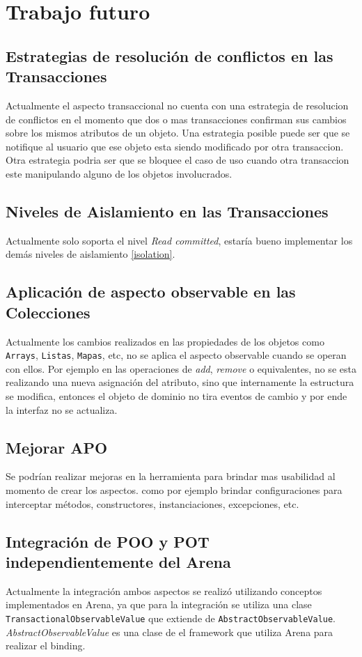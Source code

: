 
\section{Trabajo futuro}
\label{futurework}

	\subsection{Estrategias de resolución de conflictos en las Transacciones}
		Actualmente el aspecto transaccional no cuenta con una estrategia de
		resolucion de conflictos en	 el momento que dos o mas transacciones
		confirman sus cambios sobre los mismos atributos de un objeto.
		Una estrategia posible puede ser que se notifique al usuario que ese
		objeto esta siendo modificado por otra transaccion.
		Otra estrategia podria ser que se bloquee el caso de uso cuando otra
		transaccion este manipulando alguno de los objetos involucrados.

	\subsection{Niveles de Aislamiento en las Transacciones}
		Actualmente solo soporta el nivel \emph{Read committed}, estaría bueno
		implementar los demás niveles de aislamiento \ref{isolation}.
	
	\subsection{Aplicación de aspecto observable en las Colecciones}
		Actualmente los cambios realizados en las propiedades de los objetos como
		\lstinline|Arrays|, \lstinline|Listas|, \lstinline|Mapas|, etc, no se aplica
		el aspecto observable cuando se operan con ellos. Por ejemplo en las
		operaciones de \emph{add}, \emph{remove} o equivalentes, no se esta 
		realizando una nueva asignación del atributo, sino que internamente la
		estructura se modifica, entonces el objeto de dominio no tira eventos de
		cambio y por ende la interfaz no se actualiza.
		
	\subsection{Mejorar APO}
		Se podrían realizar mejoras en la herramienta para brindar mas usabilidad al
		momento de crear los aspectos. como por ejemplo brindar configuraciones para
		interceptar métodos, constructores, instanciaciones, excepciones, etc.
		
	\subsection{Integración de POO y POT independientemente del Arena}
		Actualmente la integración ambos aspectos se realizó utilizando conceptos
		implementados en Arena, ya que para la integración se utiliza una clase
		\lstinline|TransactionalObservableValue| que extiende de
		\lstinline|AbstractObservableValue|. \emph{AbstractObservableValue} es una
		clase de el framework que utiliza Arena para realizar el binding.
